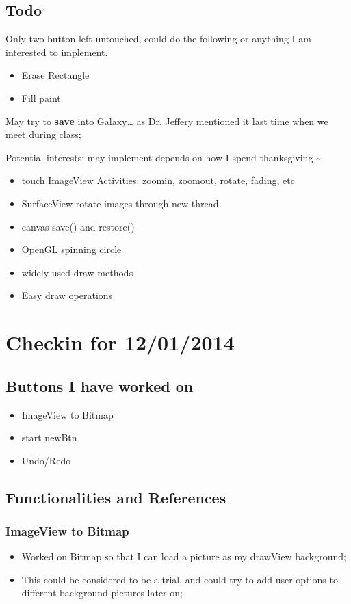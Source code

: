 \documentclass[9pt,b5paper]{article}
\begin{document}
\subsection{Todo}
\label{sec-4-4}
Only two button left untouched, could do the following or anything I am interested to implement. 
\begin{itemize}
\item Erase Rectangle
\item Fill paint
\end{itemize}

May try to \textbf{save} into Galaxy\ldots{} as Dr. Jeffery mentioned it last time when we meet during class;

Potential interests: may implement depends on how I spend thanksgiving \textasciitilde{}~
\begin{itemize}
\item touch ImageView Activities: zoomin, zoomout, rotate, fading, etc
\item SurfaceView rotate images through new thread
\item canvas save() and restore()
\item OpenGL spinning circle
\item widely used draw methods
\item Easy draw operations
\end{itemize}

\section{Checkin for 12/01/2014}
\label{sec-5}
\subsection{Buttons I have worked on}
\label{sec-5-1}
\begin{itemize}
\item ImageView to Bitmap
\item start newBtn
\item Undo/Redo
\end{itemize}
\subsection{Functionalities and References}
\label{sec-5-2}
\subsubsection{ImageView to Bitmap}
\label{sec-5-2-1}
\begin{itemize}
\item Worked on Bitmap so that I can load a picture as my drawView background;
\item This could be considered to be a trial, and could try to add user options to different background pictures later on;
\end{itemize}
\end{document}
